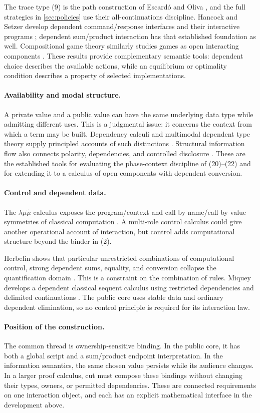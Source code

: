 The trace type (9) is the path construction of Escard\'o and Oliva
\cite[Definition~2.3]{EscardoOliva2023}, and the full strategies in
\cref{sec:policies} use their all-continuations discipline. Hancock and
Setzer develop dependent command/response interfaces and their interactive
programs \cite{HancockSetzer2000}; dependent sum/product interaction has
that established foundation as well. Compositional game theory
similarly studies games as open interacting components
\cite{GhaniEtAl2018}. These results provide complementary semantic tools:
dependent choice describes the available actions, while an equilibrium or
optimality condition describes a property of selected implementations.

\paragraph{Availability and modal structure.}
A private value and a public value can have the same underlying data type
while admitting different uses. This is a judgmental issue: it concerns the
context from which a term may be built. Dependency calculi and multimodal
dependent type theory supply principled accounts of such distinctions
\cite{ChoudhuryEadesWeirich2022,GratzerEtAl2021}. Structural information flow
also connects polarity, dependencies, and controlled disclosure
\cite{GouniEtAl2025}. These are the established tools for evaluating the
phase-context discipline of (20)--(22) and for extending it to a calculus
of open components with dependent conversion.

\paragraph{Control and dependent data.}
The $\lambda\mu\tilde\mu$ calculus exposes the program/context and
call-by-name/call-by-value symmetries of classical computation
\cite{CurienHerbelin2000}. A multi-role control calculus could give another
operational account of interaction, but control adds computational structure
beyond the binder in (2).

Herbelin shows that particular unrestricted combinations of computational
control, strong dependent sums, equality, and conversion collapse the
quantification domain \cite{Herbelin2005}. This is a constraint on the
combination of rules. Miquey develops a dependent classical sequent calculus
using restricted dependencies and delimited continuations
\cite{Miquey2017}. The public core uses stable data and ordinary dependent
elimination, so no control principle is required for its interaction law.

\paragraph{Position of the construction.}
The common thread is ownership-sensitive binding. In the public core, it has
both a global script and a sum/product endpoint interpretation. In the
information semantics, the same chosen value persists while its audience
changes. In a larger proof calculus, cut must compose these bindings without
changing their types, owners, or permitted dependencies. These are connected
requirements on one interaction object, and each has an explicit mathematical
interface in the development above.
